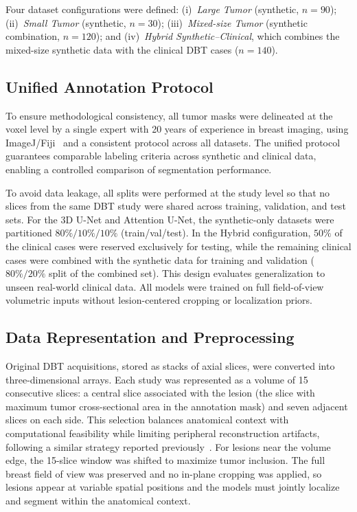 \documentclass[11pt]{article}
\begin{document}
Four dataset configurations were defined: (i)~\emph{Large Tumor} (synthetic,
$n=90$); (ii)~\emph{Small Tumor} (synthetic, $n=30$); (iii)~\emph{Mixed-size Tumor}
(synthetic combination, $n=120$); and (iv)~\emph{Hybrid Synthetic--Clinical}, which
combines the mixed-size synthetic data with the clinical DBT cases ($n=140$).

\subsection{Unified Annotation Protocol}
To ensure methodological consistency, all tumor masks were delineated at the voxel
level by a single expert with 20 years of experience in breast imaging, using
ImageJ/Fiji~\cite{fiji} and a consistent protocol across all datasets. The unified protocol
guarantees comparable labeling criteria across synthetic and clinical data,
enabling a controlled comparison of segmentation performance.

To avoid data leakage, all splits were performed at the study level so that no
slices from the same DBT study were shared across training, validation, and test
sets. For the 3D U-Net and Attention U-Net, the synthetic-only datasets were
partitioned $80\%/10\%/10\%$ (train/val/test). In the Hybrid configuration, $50\%$
of the clinical cases were reserved exclusively for testing, while the remaining
clinical cases were combined with the synthetic data for training and validation
($80\%/20\%$ split of the combined set). This design evaluates generalization to
unseen real-world clinical data. All models were trained on full field-of-view
volumetric inputs without lesion-centered cropping or localization priors.

\subsection{Data Representation and Preprocessing}
Original DBT acquisitions, stored as stacks of axial slices, were converted into
three-dimensional arrays. Each study was represented as a volume of 15 consecutive
slices: a central slice associated with the lesion (the slice with maximum tumor
cross-sectional area in the annotation mask) and seven adjacent slices on each side.
This selection balances anatomical
context with computational feasibility while limiting peripheral reconstruction
artifacts, following a similar strategy reported previously~\cite{shia2024}. For
lesions near the volume edge, the 15-slice window was shifted to maximize tumor
inclusion. The full breast field of view was preserved and no in-plane cropping was
applied, so lesions appear at variable spatial positions and the models must jointly
localize and segment within the anatomical context.
\end{document}
